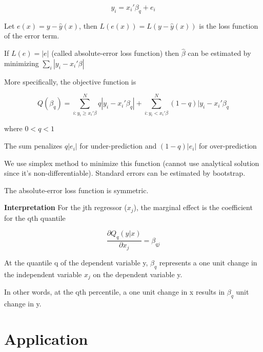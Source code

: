 \documentclass[
]{book}
\begin{document}
\[
y_i = x_i'\beta_q + e_i
\]

Let \(e(x) = y -\hat{y}(x)\), then \(L(e(x)) = L(y -\hat{y}(x))\) is the loss function of the error term.

If \(L(e) = |e|\) (called absolute-error loss function) then \(\hat{\beta}\) can be estimated by minimizing \(\sum_{i}|y_i-x_i'\beta|\)

More specifically, the objective function is

\[
Q(\beta_q)=\sum_{i:y_i \ge x_i'\beta}^{N} q|y_i - x_i'\beta_q| + \sum_{i:y_i < x_i'\beta}^{N} (1-q)|y_i-x_i'\beta_q
\]

where \(0<q<1\)

The sum penalizes \(q|e_i|\) for under-prediction and \((1-q)|e_i|\) for over-prediction

We use simplex method to minimize this function (cannot use analytical solution since it's non-differentiable). Standard errors can be estimated by bootstrap.

The absolute-error loss function is symmetric.

\textbf{Interpretation} For the jth regressor (\(x_j\)), the marginal effect is the coefficient for the qth quantile

\[
\frac{\partial Q_q(y|x)}{\partial x_j} = \beta_{qj}
\]

At the quantile q of the dependent variable y, \(\beta_q\) represents a one unit change in the independent variable \(x_j\) on the dependent variable y.

In other words, at the qth percentile, a one unit change in x results in \(\beta_q\) unit change in y.

\hypertarget{application-5}{%
\section{Application}\label{application-5}}
\end{document}
